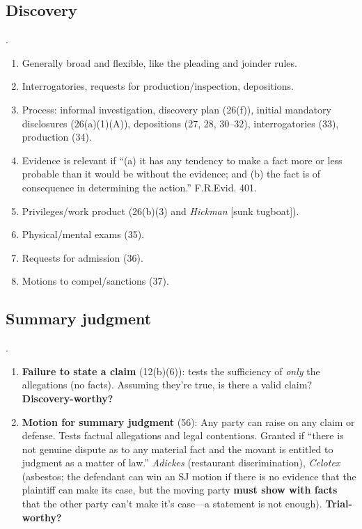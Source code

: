 \subsection{Discovery}.

\begin{enumerate}
    \item Generally broad and flexible, like the pleading and joinder rules.
    \item Interrogatories, requests for production/inspection, depositions.
    \item Process: informal investigation, discovery plan (26(f)), initial 
    mandatory disclosures (26(a)(1)(A)), depositions (27, 28, 30--32), 
    interrogatories (33), production (34).
    \item Evidence is relevant if ``(a) it has any tendency to make a fact 
    more or less probable than it would be without the evidence; and (b) the 
    fact is of consequence in determining the action.'' F.R.Evid. 401.
    \item Privileges/work product (26(b)(3) and \emph{Hickman} [sunk tugboat]).
    \item Physical/mental exams (35).
    \item Requests for admission (36).
    \item Motions to compel/sanctions (37).
\end{enumerate}

\subsection{Summary judgment}.

\begin{enumerate}
    \item \textbf{Failure to state a claim} (12(b)(6)): tests the sufficiency 
    of \emph{only} the allegations (no facts). Assuming they're true, is there 
    a valid claim? \textbf{Discovery-worthy?}
    \item \textbf{Motion for summary judgment} (56): Any party can raise on 
    any claim or defense. Tests factual allegations and legal contentions. 
    Granted if ``there is not genuine dispute as to any material fact and the 
    movant is entitled to judgment as a matter of law.'' \emph{Adickes} 
    (restaurant discrimination), \emph{Celotex} (asbestos; the defendant can 
    win an SJ motion if there is no evidence that the plaintiff can make its 
    case, but the moving party \textbf{must show with facts} that the other 
    party can't make it's case---a statement is not enough). 
    \textbf{Trial-worthy?}
\end{enumerate}

